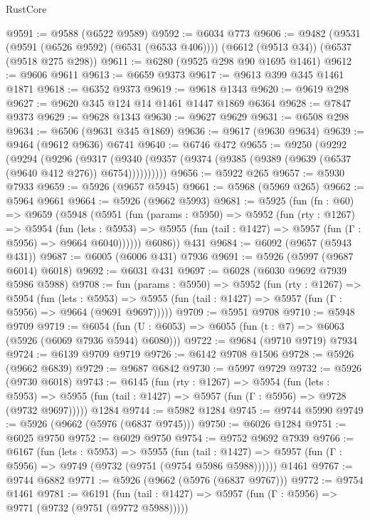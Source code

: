 \begin{lexlean}{RustCore}
\begin{coremodule}
@9591 := @9588 (@6522 @9589)
@9592 := @6034 @773
@9606 := @9482
    (@9531 (@9591 (@6526 @9592) (@6531 (@6533 @406))))
    (@6612 (@9513 @34))
    (@6537 (@9518 @275 @298))
@9611 := @6280 (@9525 @298 @90 @1695 @1461)
@9612 := @9606 @9611
@9613 := @6659 @9373
@9617 := @9613 @399 @345 @1461 @1871
@9618 := @6352 @9373
@9619 := @9618 @1343
@9620 := @9619 @298
@9627 := @9620 @345 @124 @14 @1461 @1447 @1869 @6364
@9628 := @7847 @9373
@9629 := @9628 @1343
@9630 := @9627 @9629
@9631 := @6508 @298
@9634 := @6506 (@9631 @345 @1869)
@9636 := @9617 (@9630 @9634)
@9639 := @9464 (@9612 @9636) @6741
@9640 := @6746 @472
@9655 := @9250
    (@9292
      (@9294
        (@9296
          (@9317 (@9340 (@9357 (@9374 (@9385 (@9389 (@9639 (@6537 (@9640 @412 @276)) @6754))))))))))
@9656 := @5922 @265
@9657 := @5930 @7933
@9659 := @5926 (@9657 @5945)
@9661 := @5968 (@5969 @265)
@9662 := @5964 @9661
@9664 := @5926 (@9662 @5993)
@9681 := @5925
    (fun (fn : @60) =>
    @9659
      (@5948
        (@5951
          (fun (params : @5950) =>
          @5952
            (fun (rty : @1267) =>
            @5954
              (fun (lets : @5953) =>
              @5955 (fun (tail : @1427) => @5957 (fun (Γ : @5956) => @9664 @6040))))))
        @6086))
    @431
@9684 := @6092 (@9657 (@5943 @431))
@9687 := @6005 (@6006 @431) @7936
@9691 := @5926 (@5997 (@9687 @6014) @6018)
@9692 := @6031 @431
@9697 := @6028 (@6030 @9692 @7939 @5986 @5988)
@9708 := fun (params : @5950) =>
  @5952
    (fun (rty : @1267) =>
    @5954
      (fun (lets : @5953) =>
      @5955 (fun (tail : @1427) => @5957 (fun (Γ : @5956) => @9664 (@9691 @9697)))))
@9709 := @5951 @9708
@9710 := @5948 @9709
@9719 := @6054 (fun (U : @6053) => @6055 (fun (t : @7) => @6063 (@5926 (@6069 @7936 @5944) @6080)))
@9722 := @9684 (@9710 @9719) @7934
@9724 := @6139 @9709 @9719
@9726 := @6142 @9708 @1506
@9728 := @5926 (@9662 @6839)
@9729 := @9687 @6842
@9730 := @5997 @9729
@9732 := @5926 (@9730 @6018)
@9743 := @6145
    (fun (rty : @1267) =>
    @5954
      (fun (lets : @5953) =>
      @5955 (fun (tail : @1427) => @5957 (fun (Γ : @5956) => @9728 (@9732 @9697)))))
    @1284
@9744 := @5982 @1284
@9745 := @9744 @5990
@9749 := @5926 (@9662 (@5976 (@6837 @9745)))
@9750 := @6026 @1284
@9751 := @6025 @9750
@9752 := @6029 @9750
@9754 := @9752 @9692 @7939
@9766 := @6167
    (fun (lets : @5953) =>
    @5955
      (fun (tail : @1427) => @5957 (fun (Γ : @5956) => @9749 (@9732 (@9751 (@9754 @5986 @5988))))))
    @1461
@9767 := @9744 @6882
@9771 := @5926 (@9662 (@5976 (@6837 @9767)))
@9772 := @9754 @1461
@9781 := @6191
    (fun (tail : @1427) => @5957 (fun (Γ : @5956) => @9771 (@9732 (@9751 (@9772 @5988)))))

\end{coremodule}
\end{lexlean}
